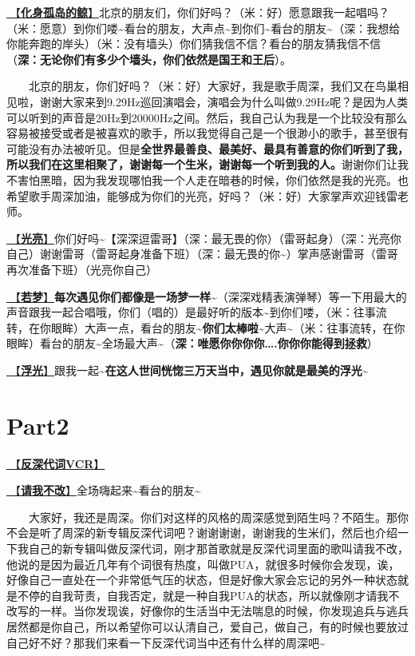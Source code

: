 \documentclass[]{ctexbook}
\begin{document}
\hyperref[hua-shen-gu-dao-de-jing]{🎵【\textbf{化身孤岛的鲸}】}北京的朋友们，你们好吗？（米：好）愿意跟我一起唱吗？（米：愿意）到你们喽\textasciitilde 看台的朋友，大声点\textasciitilde 到你们\textasciitilde 看台的朋友\textasciitilde（深：我想给你能奔跑的岸头）（米：没有墙头）你们猜我信不信？看台的朋友猜我信不信（\textbf{深：无论你们有多少个墙头，你们依然是国王和王后}）。

  北京的朋友，你们好吗？（米：好）大家好，我是歌手周深，我们又在鸟巢相见啦，谢谢大家来到9.29Hz巡回演唱会，演唱会为什么叫做9.29Hz呢？是因为人类可以听到的声音是20Hz到20000Hz之间。然后，我自己认为我是一个比较没有那么容易被接受或者是被喜欢的歌手，所以我觉得自己是一个很渺小的歌手，甚至很有可能没有办法被听见。但是\textbf{全世界最善良、最美好、最具有善意的你们听到了我，所以我们在这里相聚了，谢谢每一个生米，谢谢每一个听到我的人。}谢谢你们让我不害怕黑暗，因为我发现哪怕我一个人走在暗巷的时候，你们依然是我的光亮。也希望歌手周深加油，能够成为你们的光亮，好吗？（米：好）大家掌声欢迎钱雷老师。

\hyperref[silver-linings]{🎵【\textbf{光亮}】}你们好吗\textasciitilde【深深逗雷哥】（深：最无畏的你）（雷哥起身）（深：光亮你自己）谢谢雷哥（雷哥起身准备下班）（深：最无畏的你\textasciitilde）掌声感谢雷哥（雷哥再次准备下班）（光亮你自己）

\hyperref[ruomeng]{🎵【\textbf{若梦}】}\textbf{每次遇见你们都像是一场梦一样\textasciitilde{}}（深深戏精表演弹琴）等一下用最大的声音跟我一起合唱哦，你们（唱的）是最好听的版本\textasciitilde 到你们喽，（米：往事流转，在你眼眸）大声一点，看台的朋友\textasciitilde{}\textbf{你们太棒啦\textasciitilde{}}大声\textasciitilde（米：往事流转，在你眼眸）看台的朋友\textasciitilde 全场最大声\textasciitilde（\textbf{深：唯愿你你你你\ldots.你你你能得到拯救}）

\hyperref[floating-light]{🎵【\textbf{浮光}】}跟我一起\textasciitilde{}\textbf{在这人世间恍惚三万天当中，遇见你就是最美的浮光\textasciitilde{}}

\section{Part2}\label{beijing-20240922-part2}

\hyperref[senself-vcr]{🎥【\textbf{反深代词VCR}】}

\hyperref[brave-heart]{🎵【\textbf{请我不改}】}全场嗨起来\textasciitilde 看台的朋友\textasciitilde{}

  大家好，我还是周深。你们对这样的风格的周深感觉到陌生吗？不陌生。那你不会是听了周深的新专辑反深代词吧？谢谢谢谢，谢谢我的生米们，然后也介绍一下我自己的新专辑叫做反深代词，刚才那首歌就是反深代词里面的歌叫请我不改，他说的是因为最近几年有个词很有热度，叫做PUA，就很多时候你会发现，诶，好像自己一直处在一个非常低气压的状态，但是好像大家会忘记的另外一种状态就是不停的自我苛责，自我否定，就是一种自我PUA的状态，所以就像刚才请我不改写的一样。当你发现诶，好像你的生活当中无法喘息的时候，你发现追兵与逃兵居然都是你自己，所以希望你可以认清自己，爱自己，做自己，有的时候也要放过自己好不好？那我们来看一下反深代词当中还有什么样的周深吧\textasciitilde{}
\end{document}
